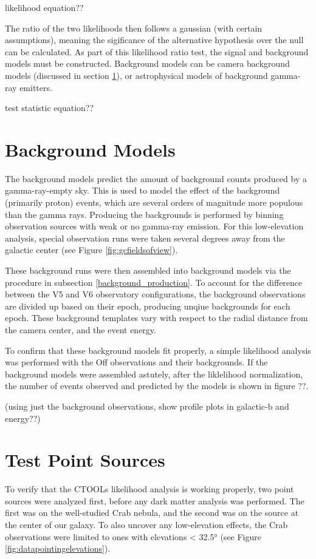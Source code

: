   {\color{red}likelihood equation??}
  
  
  The ratio of the two likelihoods then follows a gaussian (with certain assumptions), meaning the sigificance of the alternative hypothesis over the null can be calculated.
  As part of this likelihood ratio test, the signal and background models must be constructed.
  Background models can be camera background models (discussed in section \ref{sec:bkgmodels}), or astrophysical models of background gamma-ray emitters.

  {\color{red}test statistic equation??}

\section{Background Models}\label{sec:bkgmodels}
  The background models predict the amount of background counts produced by a gamma-ray-empty sky.
  This is used to model the effect of the background (primarily proton) events, which are several orders of magnitude more populous than the gamma rays.
  Producing the backgrounds is performed by binning observation sources with weak or no gamma-ray emission.
  For this low-elevation analysis, special observation runs were taken several degrees away from the galactic center (see Figure \ref{fig:gcfieldsofview}).

  These background runs were then assembled into background models via the procedure in subsection \ref{background_production}.
  To account for the difference between the V5 and V6 observatory configurations, the background observations are divided up based on their epoch, producing unqiue backgrounds for each epoch.
  These background templates vary with respect to the radial distance from the camera center, and the event energy.

  To confirm that these background models fit properly, a simple likelihood analysis was performed with the Off observations and their backgrounds.
  If the background models were assembled astutely, after the liklelihood normalization, the number of events observed and predicted by the models is shown in {\color{red}figure ??}.

  {\color{red}(using just the background observations, show profile plots in galactic-b and energy??)}

\section{Test Point Sources}
  To verify that the CTOOLs likelihood analysis is working properly, two point sources were analyzed first, before any dark matter analysis was performed.
  The first was on the well-studied Crab nebula, and the second was on the source at the center of our galaxy.
  To also uncover any low-elevation effects, the Crab observations were limited to ones with elevations < \ang{32.5} (see Figure \ref{fig:datapointingelevations}).

